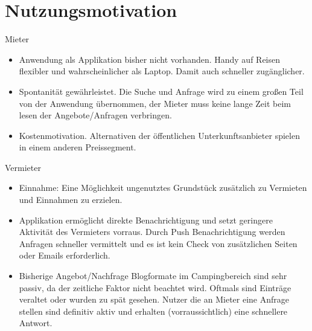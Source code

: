 
\section{Nutzungsmotivation}
Mieter
\begin{itemize}
   \item Anwendung als Applikation bisher nicht vorhanden. Handy auf Reisen flexibler und wahrscheinlicher als Laptop. Damit auch schneller zugänglicher.

   \item Spontanität gewährleistet. Die Suche und Anfrage wird zu einem großen Teil von der Anwendung übernommen, der Mieter muss keine lange Zeit beim lesen der Angebote/Anfragen verbringen.

   \item Kostenmotivation. Alternativen der öffentlichen Unterkunftsanbieter spielen in einem anderen Preissegment.

\end{itemize}

Vermieter
\begin{itemize}
   \item Einnahme: Eine Möglichkeit ungenutztes Grundstück zusätzlich zu Vermieten und Einnahmen zu erzielen.

   \item Applikation ermöglicht direkte Benachrichtigung und setzt geringere Aktivität des Vermieters vorraus. Durch Push Benachrichtigung werden Anfragen schneller vermittelt und es ist kein Check von zusätzlichen Seiten oder Emails erforderlich.
   
   \item Bisherige Angebot/Nachfrage Blogformate im Campingbereich sind sehr passiv, da der zeitliche Faktor nicht beachtet wird. Oftmals sind Einträge veraltet oder wurden zu spät gesehen. Nutzer die an Mieter eine Anfrage stellen sind definitiv aktiv und erhalten (vorraussichtlich) eine schnellere Antwort.

\end{itemize}

